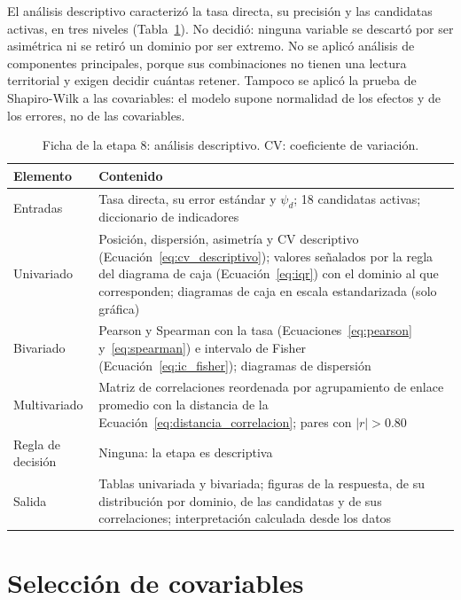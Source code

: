 El análisis descriptivo caracterizó la tasa directa, su precisión y las candidatas activas, en tres niveles (Tabla~\ref{tab:met_descriptivo}). No decidió: ninguna variable se descartó por ser asimétrica ni se retiró un dominio por ser extremo. No se aplicó análisis de componentes principales, porque sus combinaciones no tienen una lectura territorial y exigen decidir cuántas retener. Tampoco se aplicó la prueba de Shapiro-Wilk a las covariables: el modelo supone normalidad de los efectos y de los errores, no de las covariables.

\begin{table}[!htbp]
\centering
\small
\caption[Ficha de la etapa 8: análisis descriptivo]{Ficha de la etapa 8: análisis descriptivo. CV: coeficiente de variación.}
\label{tab:met_descriptivo}
\renewcommand{\arraystretch}{1.15}
\begin{tabularx}{\linewidth}{>{\raggedright\arraybackslash}p{2.8cm} >{\raggedright\arraybackslash}X}
\toprule
Elemento & Contenido \\
\midrule
Entradas & Tasa directa, su error estándar y $\psi_d$; 18 candidatas activas; diccionario de indicadores \\
Univariado & Posición, dispersión, asimetría y CV descriptivo (Ecuación~\ref{eq:cv_descriptivo}); valores señalados por la regla del diagrama de caja (Ecuación~\ref{eq:iqr}) con el dominio al que corresponden; diagramas de caja en escala estandarizada (solo gráfica) \\
Bivariado & Pearson y Spearman con la tasa (Ecuaciones~\ref{eq:pearson} y~\ref{eq:spearman}) e intervalo de Fisher (Ecuación~\ref{eq:ic_fisher}); diagramas de dispersión \\
Multivariado & Matriz de correlaciones reordenada por agrupamiento de enlace promedio con la distancia de la Ecuación~\ref{eq:distancia_correlacion}; pares con $|r| > 0.80$ \\
Regla de decisión & Ninguna: la etapa es descriptiva \\
Salida & Tablas univariada y bivariada; figuras de la respuesta, de su distribución por dominio, de las candidatas y de sus correlaciones; interpretación calculada desde los datos \\
\bottomrule
\end{tabularx}
\end{table}

\section{Selección de covariables}
\label{sec:met_seleccion}

